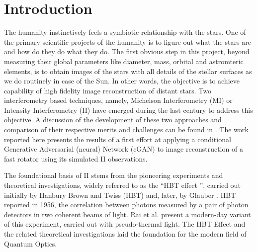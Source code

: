\section{Introduction}
The humanity instinctively feels a symbiotic relationship with the stars. One of the primary scientific projects of the humanity is to figure out what the stars are and how do they do what they do. The first obvious step in this project, beyond measuring their global parameters like diameter, mass, orbital and astromteric elements, is to obtain images of the stars with all details of the stellar surfaces as we do routinely in case of the Sun. In other words, the objective is to achieve capability of high fidelity image reconstruction of distant stars. Two interferometry based techniques, namely, Michelson Interferometry (MI) or Intensity Interferometry (II) have emerged during the last century to address this objective. A discussion of the development of these two approaches and comparison of their respective merits and challenges can be found in \citep{Rai2025}. The work reported here presents the results of a first effort at applying a conditional Generative Adversarial (neural) Network (cGAN) to image reconstruction of a fast rotator using its simulated II observations.  

The foundational basis of II stems from the pioneering experiments and theoretical investigations, widely referred to as the \textquotedblleft HBT effect \textquotedblright, carried out initially by Hanbury Brown and Twiss (HBT) \cite{HBT56Lab,brown1957interferometry, brown1958interferometry} and, later, by Glauber \citep{glauber1963quantum}. HBT reported \cite{HBT56Lab} in 1956, the correlation between photons measured by a pair of photon detectors in two coherent beams of light. Rai et al. \cite{Rai2025} present a modern-day variant of this experiment, carried out with pseudo-thermal light. The HBT Effect and the related theoretical investigations laid the foundation for the modern field of Quantum Optics.


